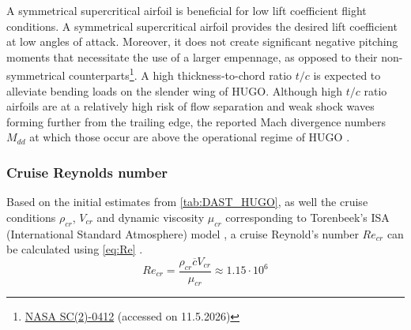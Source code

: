 A symmetrical supercritical airfoil is beneficial for low lift coefficient flight conditions.
A symmetrical supercritical airfoil provides the desired lift coefficient at low angles of attack. %
Moreover, it does not create significant negative pitching moments that necessitate the use of a larger empennage, as opposed to their non-symmetrical counterparts\footnote{\href{http://airfoiltools.com/polar/details?polar=xf-sc20412-il-1000000-n5}{NASA SC(2)-0412} (accessed on 11.5.2026)}. A high thickness-to-chord ratio $t/c$ is expected to alleviate bending loads on the slender wing of HUGO. Although high $t/c$ ratio airfoils are at a relatively high risk of flow separation and weak shock waves forming further from the trailing edge, the reported Mach divergence numbers $M_{dd}$ at which those occur are above the operational regime of HUGO \cite{Harris1990}.

\subsubsection*{Cruise Reynolds number}
Based on the initial estimates from \autoref{tab:DAST_HUGO}, as well the cruise conditions $\rho_{cr}$, $V_{cr}$ and dynamic viscosity $\mu_{cr}$ corresponding to Torenbeek's ISA (International Standard Atmosphere) model \cite{AdvancedACDesign_Torenbeek}, a cruise Reynold's number $Re_{cr}$ can be calculated using \autoref{eq:Re} \cite{torenbeek2013synthesis}.
\begin{equation}
    Re_{cr} = \frac{\rho_{cr} \overline{c}V_{cr}}{\mu_{cr}} \approx 1.15\cdot10^6
    \label{eq:Re}
\end{equation}


